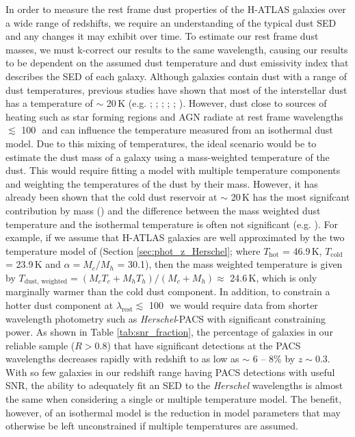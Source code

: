 In order to measure the rest frame dust properties of the H-ATLAS galaxies over a wide range of redshifts, we require an understanding of the typical dust SED and any changes it may exhibit over time. To estimate our rest frame dust masses, we must k-correct our results to the same wavelength, causing our results to be dependent on the assumed dust temperature and dust emissivity index that describes the SED of each galaxy. Although galaxies contain dust with a range of dust temperatures, previous studies have shown that most of the interstellar dust has a temperature of $\sim$ 20\,K (e.g. \citealt{Dunne_2001}; \citealt{Vlahakis_2005}; \citealt{Draine_2007a}; \citealt{Boselli_2010}; \citealt{Smith_2012b}; \citealt{Smith_2013}). However, dust close to sources of heating such as star forming regions and AGN radiate at rest frame wavelengths $\lesssim$ 100\,\micron\ and can influence the temperature measured from an isothermal dust model. Due to this mixing of temperatures, the ideal scenario would be to estimate the dust mass of a galaxy using a mass-weighted temperature of the dust. This would require fitting a model with multiple temperature components and weighting the temperatures of the dust by their mass. However, it has already been shown that the cold dust reservoir at $\sim$ 20\,K has the most signifcant contribution by mass (\citealt{Pearson_2013}) and the difference between the mass weighted dust temperature and the isothermal temperature is often not significant (e.g. \citealt{Clark_2015}). For example, if we assume that H-ATLAS galaxies are well approximated by the two temperature model of \citealt{Pearson_2013} (Section \ref{sec:phot_z_Herschel}; where $T_{\textrm{hot}}$ = 46.9\,K, $T_{\textrm{cold}}$ = 23.9\,K and $\alpha = M_c/M_h$ = 30.1), then the mass weighted temperature is given by $T_{\textrm{dust, weighted}} = (M_cT_c + M_hT_h)/(M_c + M_h) \approx$ 24.6\,K, which is only marginally warmer than the cold dust component. In addition, to constrain a hotter dust component at $\lambda_{\textrm{rest}} \lesssim$ 100\,\micron\ we would require data from shorter wavelength photometry such as \textit{Herschel}-PACS with significant constraining power. As shown in Table \ref{tab:snr_fraction}, the percentage of galaxies in our reliable sample ($R > 0.8$) that have significant detections at the PACS wavelengths decreases rapidly with redshift to as low as $\sim$ 6 -- 8\% by $z \sim 0.3$. With so few galaxies in our redshift range having PACS detections with useful SNR, the ability to adequately fit an SED to the \textit{Herschel} wavelengths is almost the same when considering a single or multiple temperature model. The benefit, however, of an isothermal model is the reduction in model parameters that may otherwise be left unconstrained if multiple temperatures are assumed.

